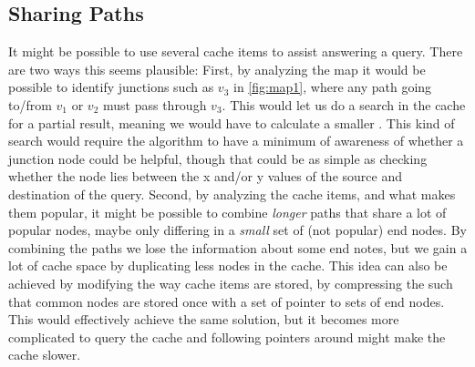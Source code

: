 




 \subsection{Sharing Paths}
It might be possible to use several cache items to assist answering a query. There are two ways this seems plausible:
First, by analyzing the map it would be possible to identify junctions such as $v_3$ in \ref{fig:map1}, where any path going to/from $v_1$ or $v_2$ must pass through $v_3$. This would let us do a search in the cache for a partial result, meaning we would have to calculate a smaller \spath. This kind of search would require the \spath algorithm to have a minimum of awareness of whether a junction node could be helpful, though that could be as simple as checking whether the node lies between the x and/or y values of the source and destination of the query.
Second, by analyzing the cache items, and what makes them popular, it might be possible to combine \textit{longer} paths that share a lot of popular nodes, maybe only differing in a \textit{small} set of (not popular) end nodes. By combining the paths we lose the information about some end notes, but we gain a lot of cache space by duplicating less nodes in the cache.
This idea can also be achieved by modifying the way cache items are stored, by compressing the \spaths such that common nodes are stored once with a set of pointer to sets of end nodes. This would effectively achieve the same solution, but it becomes more complicated to query the cache and following pointers around might make the cache slower.

